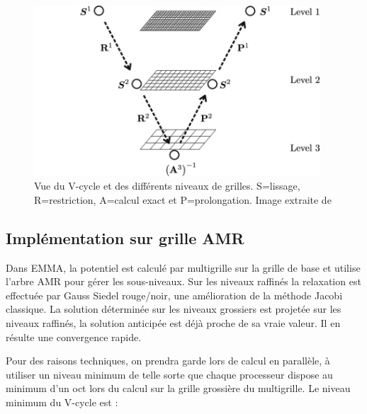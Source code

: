 \begin{figure}
	\begin{center}
	\includegraphics[width=0.95\textwidth]{img/02/Vcycle2.png}
	\caption[Multigrille]{Vue du V-cycle et des différents niveaux de grilles.
	 S=lissage, R=restriction, A=calcul exact et P=prolongation.
	 Image extraite de \cite{multigrid}
	 \label{fig:mgrid}}
	\end{center}
\end{figure}	


\subsection{Implémentation sur grille AMR}

Dans EMMA, la potentiel est calculé par multigrille sur la grille de base et utilise l'arbre \ac{AMR} pour gérer les sous-niveaux.
Sur les niveaux raffinés la relaxation est effectuée par Gauss Siedel rouge/noir, une amélioration de la méthode Jacobi classique.
La solution déterminée sur les niveaux grossiers est projetée sur les niveaux raffinés, la solution anticipée est déjà proche de sa vraie valeur. 
Il en résulte une convergence rapide.

Pour des raisons techniques, on prendra garde lors de calcul en parallèle, à utiliser un niveau minimum de telle sorte que chaque processeur dispose au minimum d'un oct lors du calcul sur la grille grossière du multigrille.
Le niveau minimum du V-cycle est : 

